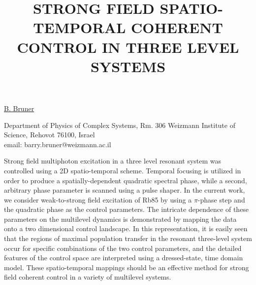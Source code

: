 \title{STRONG FIELD SPATIO-TEMPORAL COHERENT CONTROL IN THREE LEVEL SYSTEMS}

\underline{B. Bruner}


Department of Physics of Complex Systems, Rm. 306
Weizmann Institute of Science,
Rehovot 76100, Israel\\
email: barry.bruner@weizmann.ac.il

Strong field multiphoton excitation in a three level resonant system was controlled using a 2D spatio-temporal scheme.  Temporal focusing is utilized in order to produce a spatially-dependent quadratic spectral phase, while a second, arbitrary phase parameter is scanned using a pulse shaper.  In the current work, we consider weak-to-strong field excitation of Rb85 by using a $\pi$-phase step and the quadratic phase as the control parameters. The intricate dependence of these parameters on the multilevel dynamics is demonstrated by mapping the data onto a two dimensional control landscape.  In this representation, it is easily seen that the regions of maximal population transfer in the resonant three-level system occur for specific combinations of the two control parameters, and the detailed features of the control space are interpreted using a dressed-state, time domain model. These spatio-temporal mappings should be an effective method for strong field coherent control in a variety of multilevel systems.

\vspace{\baselineskip}